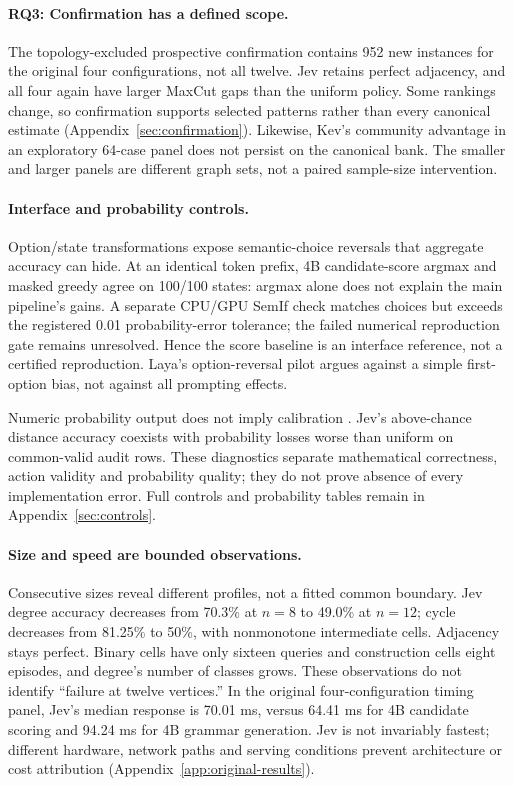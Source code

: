 \paragraph{RQ3: Confirmation has a defined scope.}
The topology-excluded prospective confirmation contains 952 new instances
for the original four configurations, not all twelve.
Jev retains perfect adjacency, and all four again have larger MaxCut gaps
than the uniform policy. Some rankings change, so confirmation supports
selected patterns rather than every canonical estimate
(Appendix~\ref{sec:confirmation}).
Likewise, Kev's community advantage in an exploratory 64-case panel does
not persist on the canonical bank. The smaller and larger panels are
different graph sets, not a paired sample-size intervention.

\paragraph{Interface and probability controls.}
Option/state transformations expose semantic-choice reversals that
aggregate accuracy can hide. At an identical token prefix, 4B
candidate-score argmax and masked greedy agree on 100/100 states:
argmax alone does not explain the main pipeline's gains.
A separate CPU/GPU SemIf check matches choices but exceeds the registered
0.01 probability-error tolerance; the failed numerical reproduction
gate remains unresolved. Hence the score baseline is an interface
reference, not a certified reproduction.
Laya's option-reversal pilot argues against a simple first-option bias,
not against all prompting effects.

Numeric probability output does not imply calibration
\cite{gneiting2007proper,guo2017calibration}. Jev's above-chance distance
accuracy coexists with probability losses worse than uniform on
common-valid audit rows. These diagnostics separate mathematical
correctness, action validity and probability quality; they do not prove
absence of every implementation error. Full controls and probability
tables remain in Appendix~\ref{sec:controls}.

\paragraph{Size and speed are bounded observations.}
Consecutive sizes reveal different profiles, not a fitted common boundary.
Jev degree accuracy decreases from 70.3\% at $n=8$ to 49.0\% at $n=12$;
cycle decreases from 81.25\% to 50\%, with nonmonotone intermediate cells.
Adjacency stays perfect. Binary cells have only sixteen queries and
construction cells eight episodes, and degree's number of classes grows.
These observations do not identify ``failure at twelve vertices.''
In the original four-configuration timing panel, Jev's median response is
70.01 ms, versus 64.41 ms for 4B candidate scoring and 94.24 ms for
4B grammar generation. Jev is not invariably fastest; different hardware,
network paths and serving conditions prevent architecture or cost attribution
(Appendix~\ref{app:original-results}).

